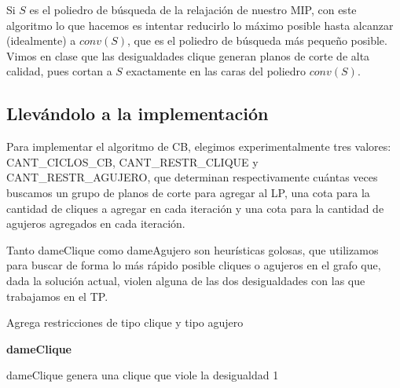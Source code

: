 \documentclass[a4paper, 10pt, twoside]{article}
\begin{document}
Si $S$ es el poliedro de búsqueda de la relajación de nuestro MIP, con este algoritmo lo que hacemos es intentar reducirlo lo máximo posible hasta alcanzar (idealmente) a $conv(S)$, que es el poliedro de búsqueda más pequeño posible. Vimos en clase que las desigualdades clique generan planos de corte de alta calidad, pues cortan a $S$ exactamente en las caras del poliedro $conv(S)$.

\subsection{Llevándolo a la implementación}

Para implementar el algoritmo de CB, elegimos experimentalmente tres valores: CANT\_CICLOS\_CB, CANT\_RESTR\_CLIQUE y CANT\_RESTR\_AGUJERO, que determinan respectivamente cuántas veces buscamos un grupo de planos de corte para agregar al LP, una cota para la cantidad de cliques a agregar en cada iteración y una cota para la cantidad de agujeros agregados en cada iteración.

Tanto dameClique como dameAgujero son heurísticas golosas, que utilizamos para buscar de forma lo más rápido posible cliques o agujeros en el grafo que, dada la solución actual, violen alguna de las dos desigualdades con las que trabajamos en el TP.\\

\begin{algorithm}[H]
\caption{Agrega restricciones de tipo clique y tipo agujero}
\end{algorithm}


\begin{algorithm}[H]
	\textbf{dameClique}\\
\caption{dameClique genera una clique que viole la desigualdad 1}
\end{algorithm}
\end{document}
